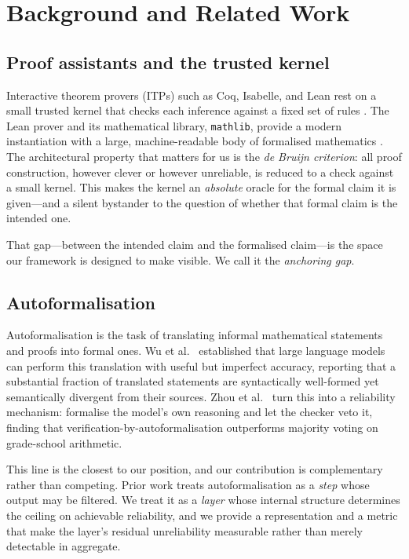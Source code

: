 \documentclass[11pt,a4paper]{article}
\theoremstyle{definition}
\theoremstyle{plain}
\theoremstyle{remark}
\begin{document}
\section{Background and Related Work}
\label{sec:related}

\subsection{Proof assistants and the trusted kernel}

Interactive theorem provers (ITPs) such as Coq, Isabelle, and Lean rest on a
small trusted kernel that checks each inference against a fixed set of rules
\cite{maric2015survey}. The Lean prover and its mathematical library,
\texttt{mathlib}, provide a modern instantiation with a large, machine-readable
body of formalised mathematics \cite{demoura2015lean,mathlib2020lean}. The
architectural property that matters for us is the \emph{de Bruijn criterion}:
all proof construction, however clever or however unreliable, is reduced to a
check against a small kernel. This makes the kernel an \emph{absolute} oracle
for the formal claim it is given---and a silent bystander to the question of
whether that formal claim is the intended one.

That gap---between the intended claim and the formalised claim---is the space
our framework is designed to make visible. We call it the \emph{anchoring
gap}.

\subsection{Autoformalisation}

Autoformalisation is the task of translating informal mathematical statements
and proofs into formal ones. Wu et al.\ \cite{wu2022autoformalization}
established that large language models can perform this translation with useful
but imperfect accuracy, reporting that a substantial fraction of translated
statements are syntactically well-formed yet semantically divergent from their
sources. Zhou et al.\ \cite{zhou2024donttrust} turn this into a reliability
mechanism: formalise the model's own reasoning and let the checker veto it,
finding that verification-by-autoformalisation outperforms majority voting on
grade-school arithmetic.

This line is the closest to our position, and our contribution is
complementary rather than competing. Prior work treats autoformalisation as a
\emph{step} whose output may be filtered. We treat it as a \emph{layer} whose
internal structure determines the ceiling on achievable reliability, and we
provide a representation and a metric that make the layer's residual
unreliability measurable rather than merely detectable in aggregate.
\end{document}
